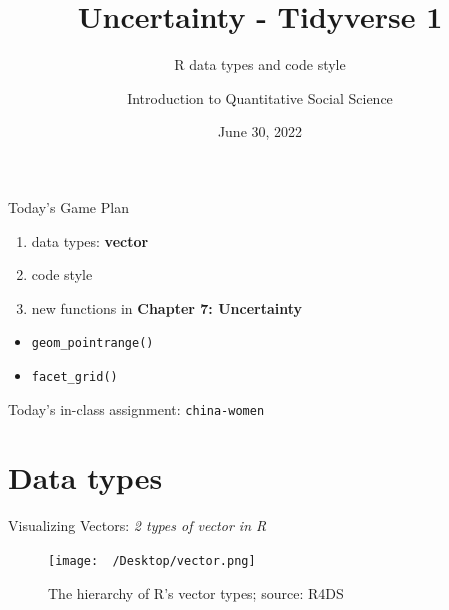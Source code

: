 \documentclass[
  ignorenonframetext,
]{beamer}
\title{Uncertainty - Tidyverse 1}
\subtitle{R data types and code style}
\author{Introduction to Quantitative Social Science}
\date{June 30, 2022}
\institute{Xiaolong Yang \and University of Tokyo}
\providecommand{\tightlist}{%
  \setlength{\itemsep}{0pt}\setlength{\parskip}{0pt}}\usepackage{longtable,booktabs,array}
\begin{document}
\frame{\titlepage}
\ifdefined\Shaded\renewenvironment{Shaded}{\begin{tcolorbox}[breakable, frame hidden, boxrule=0pt, enhanced, borderline west={3pt}{0pt}{shadecolor}, sharp corners, interior hidden]}{\end{tcolorbox}}\fi

\begin{frame}[fragile]{Today's Game Plan}
\protect\hypertarget{todays-game-plan}{}
\begin{enumerate}
\tightlist
\item
  data types: \textbf{vector}
\item
  code style
\item
  new functions in \textbf{Chapter 7: Uncertainty}
\end{enumerate}

\begin{itemize}
\tightlist
\item
  \texttt{geom\_pointrange()}
\item
  \texttt{facet\_grid()}
\end{itemize}

\begin{tcolorbox}[enhanced jigsaw, breakable, opacityback=0, toprule=.15mm, colframe=quarto-callout-note-color-frame, leftrule=.75mm, colback=white, arc=.35mm, rightrule=.15mm, bottomrule=.15mm, left=2mm]
\begin{minipage}[t]{5.5mm}
\textcolor{quarto-callout-note-color}{\faInfo}
\end{minipage}%
\begin{minipage}[t]{\textwidth - 5.5mm}
Today's in-class assignment: \texttt{china-women}\end{minipage}%
\end{tcolorbox}
\end{frame}

\hypertarget{data-types}{%
\section{Data types}\label{data-types}}

\begin{frame}{Visualizing Vectors: \emph{2 types of vector in R}}
\protect\hypertarget{visualizing-vectors-2-types-of-vector-in-r}{}
\begin{figure}

{\centering \texttt{[image: ~/Desktop/vector.png]}

}

\caption{The hierarchy of R's vector types; source: R4DS}

\end{figure}
\end{frame}
\end{document}
